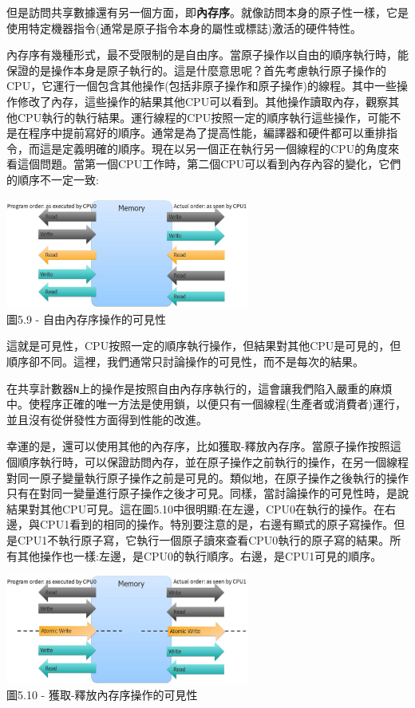 但是訪問共享數據還有另一個方面，即\textbf{內存序}。就像訪問本身的原子性一樣，它是使用特定機器指令(通常是原子指令本身的屬性或標誌)激活的硬件特性。

內存序有幾種形式，最不受限制的是自由序。當原子操作以自由的順序執行時，能保證的是操作本身是原子執行的。這是什麼意思呢？首先考慮執行原子操作的CPU，它運行一個包含其他操作(包括非原子操作和原子操作)的線程。其中一些操作修改了內存，這些操作的結果其他CPU可以看到。其他操作讀取內存，觀察其他CPU執行的執行結果。運行線程的CPU按照一定的順序執行這些操作，可能不是在程序中提前寫好的順序。通常是為了提高性能，編譯器和硬件都可以重排指令，而這是定義明確的順序。現在以另一個正在執行另一個線程的CPU的角度來看這個問題。當第一個CPU工作時，第二個CPU可以看到內存內容的變化，它們的順序不一定一致:

\begin{center}
\includegraphics[width=0.6\textwidth]{content/1/chapter5/images/9.jpg}\\
圖5.9 - 自由內存序操作的可見性
\end{center}

這就是可見性，CPU按照一定的順序執行操作，但結果對其他CPU是可見的，但順序卻不同。這裡，我們通常只討論操作的可見性，而不是每次的結果。

在共享計數器\texttt{N}上的操作是按照自由內存序執行的，這會讓我們陷入嚴重的麻煩中。使程序正確的唯一方法是使用鎖，以便只有一個線程(生產者或消費者)運行，並且沒有從併發性方面得到性能的改進。

幸運的是，還可以使用其他的內存序，比如獲取-釋放內存序。當原子操作按照這個順序執行時，可以保證訪問內存，並在原子操作之前執行的操作，在另一個線程對同一原子變量執行原子操作之前是可見的。類似地，在原子操作之後執行的操作只有在對同一變量進行原子操作之後才可見。同樣，當討論操作的可見性時，是說結果對其他CPU可見。這在圖5.10中很明顯:在左邊，CPU0在執行的操作。在右邊，與CPU1看到的相同的操作。特別要注意的是，右邊有顯式的原子寫操作。但是CPU1不執行原子寫，它執行一個原子讀來查看CPU0執行的原子寫的結果。所有其他操作也一樣:左邊，是CPU0的執行順序。右邊，是CPU1可見的順序。

\begin{center}
\includegraphics[width=0.6\textwidth]{content/1/chapter5/images/10.jpg}\\
圖5.10 - 獲取-釋放內存序操作的可見性
\end{center}

